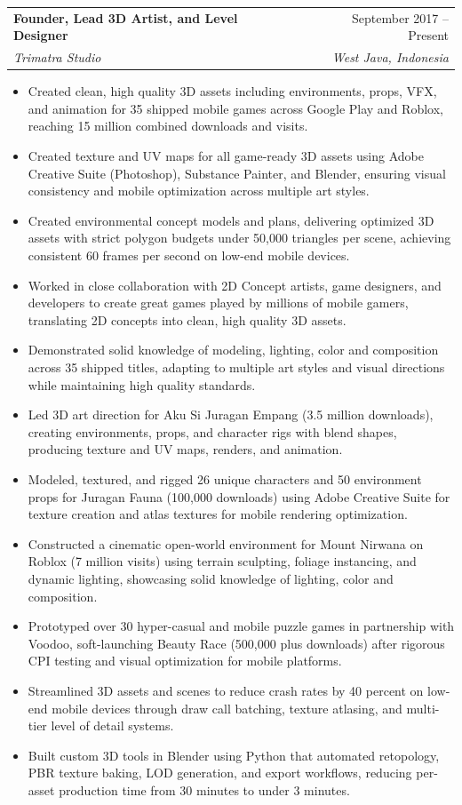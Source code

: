 \documentclass[letterpaper,11pt]{article}
\makeatletter
\newcommand{\resumeItem}[1]{
  \item\small{
    {#1 \vspace{-2pt}}
  }
}
\newcommand{\resumeSubheading}[4]{
  \vspace{-2pt}\item
    \begin{tabular*}{0.97\textwidth}[t]{l@{\extracolsep{\fill}}r}
      \textbf{#1} & #2 \\
      \textit{\small#3} & \textit{\small #4} \\
    \end{tabular*}\vspace{-7pt}
}
\newcommand{\resumeItemListStart}{\begin{itemize}}
\newcommand{\resumeItemListEnd}{\end{itemize}\vspace{-5pt}}
\makeatother
\begin{document}
    \resumeSubheading
      {Founder, Lead 3D Artist, and Level Designer}{September 2017 -- Present}
      {Trimatra Studio}{West Java, Indonesia}
      \resumeItemListStart
        \resumeItem{Created clean, high quality 3D assets including environments, props, VFX, and animation for 35 shipped mobile games across Google Play and Roblox, reaching 15 million combined downloads and visits.}
        \resumeItem{Created texture and UV maps for all game-ready 3D assets using Adobe Creative Suite (Photoshop), Substance Painter, and Blender, ensuring visual consistency and mobile optimization across multiple art styles.}
        \resumeItem{Created environmental concept models and plans, delivering optimized 3D assets with strict polygon budgets under 50,000 triangles per scene, achieving consistent 60 frames per second on low-end mobile devices.}
        \resumeItem{Worked in close collaboration with 2D Concept artists, game designers, and developers to create great games played by millions of mobile gamers, translating 2D concepts into clean, high quality 3D assets.}
        \resumeItem{Demonstrated solid knowledge of modeling, lighting, color and composition across 35 shipped titles, adapting to multiple art styles and visual directions while maintaining high quality standards.}
        \resumeItem{Led 3D art direction for Aku Si Juragan Empang (3.5 million downloads), creating environments, props, and character rigs with blend shapes, producing texture and UV maps, renders, and animation.}
        \resumeItem{Modeled, textured, and rigged 26 unique characters and 50 environment props for Juragan Fauna (100,000 downloads) using Adobe Creative Suite for texture creation and atlas textures for mobile rendering optimization.}
        \resumeItem{Constructed a cinematic open-world environment for Mount Nirwana on Roblox (7 million visits) using terrain sculpting, foliage instancing, and dynamic lighting, showcasing solid knowledge of lighting, color and composition.}
        \resumeItem{Prototyped over 30 hyper-casual and mobile puzzle games in partnership with Voodoo, soft-launching Beauty Race (500,000 plus downloads) after rigorous CPI testing and visual optimization for mobile platforms.}
        \resumeItem{Streamlined 3D assets and scenes to reduce crash rates by 40 percent on low-end mobile devices through draw call batching, texture atlasing, and multi-tier level of detail systems.}
        \resumeItem{Built custom 3D tools in Blender using Python that automated retopology, PBR texture baking, LOD generation, and export workflows, reducing per-asset production time from 30 minutes to under 3 minutes.}
      \resumeItemListEnd
\end{document}
